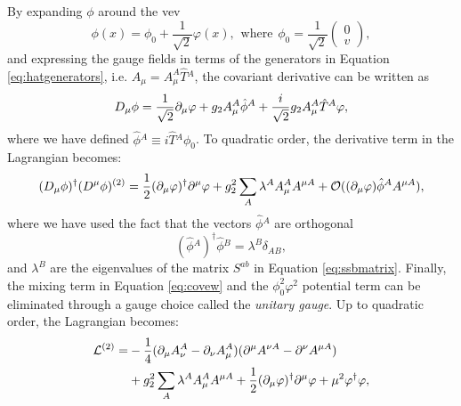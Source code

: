 By expanding $\phi$ around the vev
\begin{equation}\label{eq:vevhiggs}
    \phi(x) = \phi_0+\frac{1}{\sqrt{2}}\varphi(x),\hspace{5pt}\text{where}\hspace{5pt}\phi_0=\frac{1}{\sqrt{2}}\begin{pmatrix}
        0\\
        v
    \end{pmatrix},
\end{equation}
and expressing the gauge fields in terms of the generators in Equation \ref{eq:hatgenerators}, i.e. $A_\mu=A_\mu^A\hat{T}{}^A$, the covariant derivative can be written as
\begin{equation}
    D_\mu\phi=\frac{1}{\sqrt{2}}\partial_\mu\varphi+g_2A_\mu^A\hat{\phi}{}^A+\frac{i}{\sqrt{2}}g_2A_\mu^A\hat{T}{}^A\varphi,
\end{equation}
where we have defined $\hat{\phi}{}^A\equiv i\hat{T}{}^A\phi_0$. To quadratic order, the derivative term in the Lagrangian becomes:
\begin{equation}\label{eq:covew}
    (D_\mu\phi)^\dagger(D^\mu\phi)^{(2)}=\frac{1}{2}(\partial_\mu\varphi)^\dagger\partial^\mu\varphi+g_2^2\sum_A\lambda^AA^A_\mu A^{\mu A}+\mathcal{O}((\partial_\mu\varphi)\hat{\phi}{}^AA^{\mu A}),
\end{equation}
where we have used the fact that the vectors $\hat{\phi}{}^A$ are orthogonal
\begin{equation}
    (\hat{\phi}{}^A)^\dagger\hat{\phi}{}^B=\lambda^B\delta_{AB},
\end{equation}
and $\lambda^B$ are the eigenvalues of the matrix $S^{ab}$ in Equation \ref{eq:ssbmatrix}. Finally, the mixing term in Equation \ref{eq:covew} and the $\phi_0^2\varphi^2$ potential term can be eliminated through a gauge choice called the \textit{unitary gauge}. Up to quadratic order, the Lagrangian becomes:
\begin{align}
    \begin{split}
        \mathcal{L}^{(2)}=&-\frac{1}{4}(\partial_\mu A_\nu^A-\partial_\nu A_\mu^A)(\partial^\mu A^{\nu A}-\partial^\nu A^{\mu A})\\
        &+g_2^2\sum_A\lambda^AA^A_\mu A^{\mu A}+\frac{1}{2}(\partial_\mu\varphi)^\dagger\partial^\mu\varphi+\mu^2\varphi^\dagger\varphi,
    \end{split}
\end{align}
